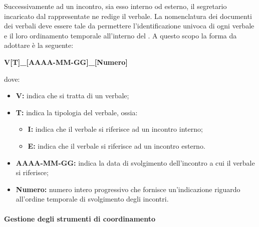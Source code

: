 				Successivamente ad un incontro, sia esso interno od esterno, il segretario incaricato dal rappresentate ne redige il verbale.
				\newline
				La nomenclatura dei documenti dei verbali deve essere tale da permettere l'identificazione univoca di ogni verbale e il loro ordinamento temporale all'interno del . A questo scopo la forma da adottare è la seguente:
				\begin{center}
					\textbf{V[T]\_[AAAA-MM-GG]\_[Numero]}
				\end{center}
				dove:
				\begin{itemize}
					\item \textbf{V:} indica che si tratta di un verbale;
					\item \textbf{T:} indica la tipologia del verbale, ossia:
					\begin{itemize}
						\item \textbf{I:} indica che il verbale si riferisce ad un incontro interno;
						\item \textbf{E:} indica che il verbale si riferisce ad un incontro esterno.
					\end{itemize}
					\item \textbf{AAAA-MM-GG:} indica la data di svolgimento dell'incontro a cui il verbale si riferisce;
					\item \textbf{Numero:} numero intero progressivo che fornisce un'indicazione riguardo all'ordine temporale di svolgimento degli incontri.
				\end{itemize}
		
		\paragraph{Gestione degli strumenti di coordinamento}

